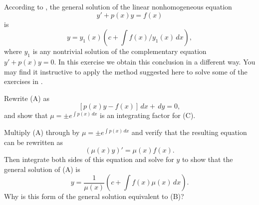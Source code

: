 \begin{exerciselist}
\item\label{exer:2.6.30}According to , the general solution of the
linear nonhomogeneous equation
\[
y'+p(x)y=f(x)\tag{A}
\]
is
\[
y=y_1(x)\left(c+\int f(x)/y_1(x)\,dx\right),\tag{B}
\]
where $y_1$ is any nontrivial solution of the
complementary equation $y'+p(x)y=0$. In this exercise we obtain this
conclusion in a different way.
You may find it instructive to apply the method suggested here
to solve some of the exercises in .
\begin{alist}
\item %
Rewrite (A) as
\[
[p(x)y-f(x)]\,dx+\,dy=0,\tag{C}
\]
and show that $\mu=\pm e^{\int p(x)\,dx}$ is an integrating factor
for (C).
\item %
Multiply (A) through by $\mu=\pm e^{\int p(x)\,dx}$  and verify that
the resulting equation can be rewritten as
\[
(\mu(x)y)'=\mu(x)f(x).
\]
Then integrate both sides of this equation and solve for $y$
to show that the general solution of (A) is
\[
y=\frac{1}{\mu(x)}\left(c+\int f(x)\mu(x)\,dx\right).
\]
Why is this form of the general solution
 equivalent to (B)?
\end{alist}

\end{exerciselist}
